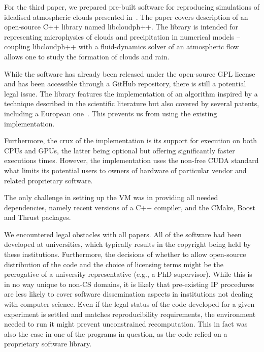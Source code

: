 
For the third paper, we prepared pre-built software for reproducing 
  simulations of idealised atmospheric clouds presented in~\cite{arabas2013libcloud}.
The paper covers description of an open-source C++ library named libcloudph++. 
The library is intended for representing microphysics of clouds and precipitation
  in numerical models -- coupling libcloudph++ with a fluid-dynamics solver 
  of an atmospheric flow allows one to study the formation of clouds and rain.

While the software has already been released under the open-source GPL license
  and has been accessible through a GitHub repository, there is still
  a potential legal issue.
The library features the implementation of an algorithm inspired by a technique 
  described in the scientific literature but also covered by several patents,
  including a European one~\cite{shima2007simulation}. This prevents us from using the
  existing implementation.

Furthermore, the crux of the implementation is its support for execution
  on both CPUs and GPUs, the latter being optional but offering 
  significantly faster executions times.
However, the implementation uses the non-free CUDA standard what limits its potential
  users to owners of hardware of particular vendor and related proprietary software.

The only challenge in setting up the VM was in providing all needed
  dependencies, namely recent versions of a C++ compiler, and the CMake, Boost and Thrust 
  packages.


We encountered legal obstacles with all papers.
All of the software had been developed at universities, which typically results in the copyright being held by these institutions.
Furthermore, the decisions of whether to allow open-source distribution of the
code and the choice of licensing terms might be the prerogative of a university
representative (e.g., a PhD supervisor).
While this is in no way unique to non-CS domains, it is likely that pre-existing IP procedures are less likely to cover software dissemination aspects in institutions not dealing with computer science.
Even if the legal status of the code developed for a given experiment is settled and matches reproducibility requirements, the environment needed to run it might prevent unconstrained recomputation.
This in fact was also the case in one of the programs in question, as the code relied on a proprietary software library.


